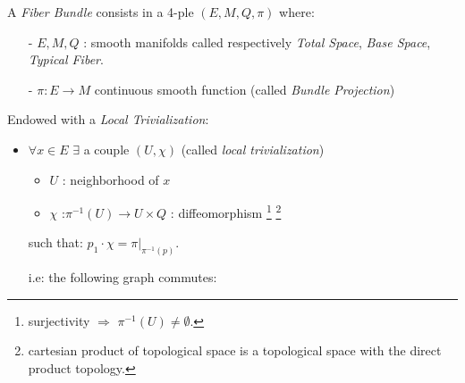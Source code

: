 \documentclass[Main]{subfiles}
\begin{document}
			\begin{definition}\label{Def:SmoothBundle}
				A \emph{Fiber Bundle} consists in a 4-ple $(E,M,Q,\pi)$ where:
				\begin{itemize}
					\item[-] $E,M,Q$ :  smooth manifolds called respectively \emph{Total Space}, \emph{Base Space}, \emph{Typical Fiber}.
					\item[-] $\pi : E \rightarrow M $ continuous smooth function (called \emph{Bundle Projection})
				\end{itemize}
				Endowed with a \emph{Local Trivialization}:
				\begin{itemize}
					\item $\forall x \in E$ $\exists$ a couple $(U, \chi)$ (called \emph{local trivialization})
					\begin{itemize}
						\item $U$ : neighborhood of $x$
						\item $\chi$ :$\pi^{-1}(U) \rightarrow U \times Q$ : diffeomorphism
 							\footnote{surjectivity $\Rightarrow$ $\pi^{-1}(U) \neq \emptyset$.} 
 							\footnote{cartesian product of topological space is a topological space with the direct product topology.}
					\end{itemize}
					such that: $p_1 \cdot \chi = \pi \vert_{\pi^{-1}(p)}$.

					i.e: the following graph commutes:

				\end{itemize}
			\end{definition}
\end{document}
